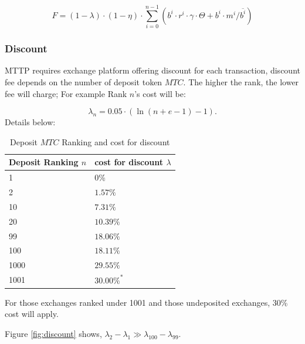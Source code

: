 \documentclass[UTF8,nofonts]{article}
\begin{document}
\begin{equation*}
F =(1-\lambda)\cdot (1-\eta) \cdot \sum^{n-1}_{i=0} (b^i \cdot r^i \cdot \gamma \cdot \Theta + b^i \cdot m^i / \overline{b^i})
\end{equation*}


\subsubsection{Discount}
MTTP requires exchange platform offering discount for each transaction,  discount fee depends on the number of deposit token $MTC$. The higher the rank,  the lower fee will charge; For example Rank $n$'s cost will be:

$$\lambda_{n} = 0.05\cdot(\ln (n+e-1) - 1)\text{.}$$
Details below:


\begin{table}[hbt]
 \centering
\begin{tabular}{p{3.5cm}|p{3cm}} %
Deposit Ranking $n$ & cost for discount $\lambda$ \\ %
  \hline
1 & 0\%\\
\hline
2 & $1.57\%$\\
\hline
10 & $7.31\%$\\
\hline
20 & $10.39\%$\\
\hline
99 &$18.06\%$\\
\hline
100 &$18.11\%$\\
\hline
1000 &$29.55\%$\\
\hline
1001 &$30.00\%^*$\\
 \end{tabular}
\caption{Deposit $MTC$ Ranking and cost for discount} %
\end{table}


For those exchanges ranked under 1001 and those undeposited exchanges, 30\% cost will apply.

Figure \ref{fig:discount} shows, $\lambda_{2} - \lambda_{1} \gg \lambda_{100} - \lambda_{99}$.
\end{document}
